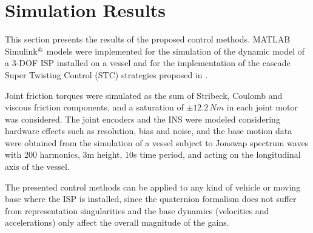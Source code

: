 \section{Simulation Results}
\label{sec:simulation_results}

This section presents the results of the proposed control methods.
%
MATLAB Simulink$^\text{{\tiny{\circledR}}}$ models were implemented for the simulation of the dynamic model of a $3$-DOF ISP installed on a vessel and for the implementation of the cascade Super Twisting Control (STC) strategies proposed in .

Joint friction torques were simulated as the sum of Stribeck, Coulomb and viscous friction components, and a saturation of $\pm 12.2 \, Nm$ in each joint motor was considered.
%
The joint encoders and the INS were modeled considering hardware effects such as resolution, bias and noise, and the base motion data
were obtained from the simulation of a vessel subject to Jonswap spectrum waves with 200 harmonics, $3$m height, $10$s time period, and acting on the longitudinal axis of the vessel.

\begin{remark}
The presented control methods can be applied to any kind of vehicle or moving base where the ISP is installed, since the quaternion formalism does not suffer from representation singularities and the base dynamics (velocities and accelerations) only affect the overall magnitude of the gains.
\end{remark}

